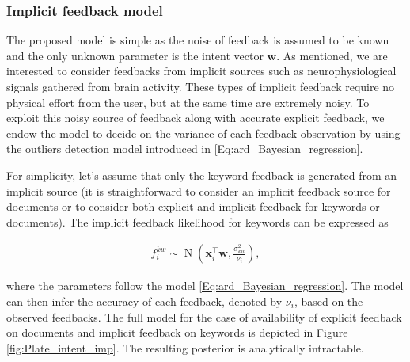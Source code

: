 \documentclass[dissertation,math,vertlayout,pdfa,colorlinks]{aaltoseries}
\newcommand{\bw}{\bm{w}}
\DeclareMathOperator{\normalpdf}{N}
\newcommand{\tp}{^{\top}}
\begin{document}
\subsubsection{Implicit feedback model}

The proposed model is simple as the noise of feedback is assumed to be known and the only unknown parameter is the intent vector $\bw$. As mentioned, we are interested to consider feedbacks from implicit sources such as neurophysiological signals gathered from brain activity. %
These types of implicit feedback require no physical effort from the user, but at the same time are extremely noisy. To exploit this noisy source of feedback along with accurate explicit feedback, we endow the model to decide on the variance of each feedback observation by using the outliers detection model introduced in \ref{Eq:ard_Bayesian_regression}. %

For simplicity, let's assume that only the keyword feedback is generated from an implicit source (it is straightforward to consider an implicit feedback source for documents or to consider both explicit and implicit feedback for keywords or documents). The implicit feedback likelihood for keywords can be expressed as 

\begin{align}\label{Eq:imp_fb_on_kw} 
f_{i}^{kw} \sim \normalpdf(\bm{x}_i\tp\bw,\frac{\sigma_{kw}^2}{\nu_i}),
\end{align}  

\noindent where the parameters follow the model \ref{Eq:ard_Bayesian_regression}. The model can then infer the accuracy of each feedback, denoted by $\nu_i$, based on the observed feedbacks. The full model for the case of availability of explicit feedback on documents and implicit feedback on keywords is depicted in Figure \ref{fig:Plate_intent_imp}. The resulting posterior is analytically intractable.  
\end{document}
